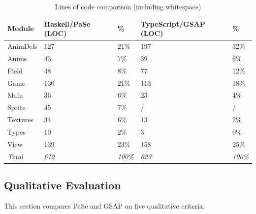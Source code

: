 \begin{table}[t!]
\caption{Lines of code comparison (including whitespace)}
\centering
\label{tbl:loc}
\begin{center}
\begin{tabular}{l@{\hskip 0.5cm}ll@{\hskip 0.2cm}ll}
 \textbf{Module} & \textbf{Haskell/PaSe (LOC)} & \textbf{\%} & \textbf{TypeScript/GSAP (LOC)} & \textbf{\%} \\
 \hline
 AnimDefs & 127 & 21\% & 197 & 32\% \\ 
 Anims & 43 & 7\% & 39 & 6\% \\  
 Field & 48 & 8\% & 77 & 12\% \\  
 Game & 130 & 21\% & 113 & 18\% \\  
 Main & 36 & 6\% & 23 & 4\% \\  
 Sprite & 45 & 7\% & / & / \\  
 Textures & 34 & 6\% & 13 & 2\% \\  
 Types & 10 & 2\% & 3 & 0\% \\  
 View & 139 & 23\% & 158 & 25\% \\
 \emph{Total} & \emph{612} & \emph{100\%} & \emph{623} & \emph{100\%}
\end{tabular}
\end{center}
\end{table}

\subsection{Qualitative Evaluation}

This section compares PaSe and GSAP on five qualitative criteria.

